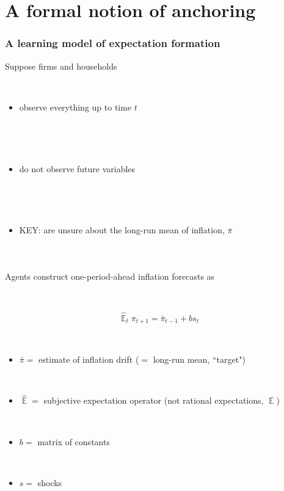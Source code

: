 \documentclass{beamer}
\DeclareMathOperator{\E}{\mathbb{E}}
\begin{document}
\section{A formal notion of anchoring}
\begin{frame}
	\frametitle{A learning model of expectation formation}
Suppose firms and households

\

\begin{itemize}
\item observe everything up to time $t$ 

\

\

\item do not observe future variables

\

\

\item KEY: are unsure about the long-run mean of inflation, $\bar{\pi}$
\end{itemize}


\



\end{frame}

\begin{frame}
	\frametitle{}

Agents construct one-period-ahead inflation forecasts as

\

\begin{equation}
\hat{\E}_{t}\pi_{t+1} =  \bar{\pi}_{t-1}+bs_{t} \label{PLM}
\end{equation}

\

\begin{itemize}
\item[] $\bar{\pi} =$ estimate of inflation drift ($=$ long-run mean, ``target")

\



\item[] $\hat{\E} =$ subjective expectation operator (not rational expectations, $\E$)

\



\item[] $b =$ matrix of constants 

\

\item[] $s =$ shocks
\end{itemize}

\



\end{frame}
\end{document}
